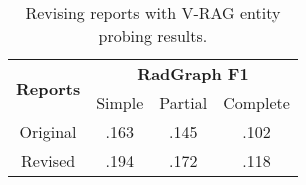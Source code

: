 \begin{table}[]
\begin{center}
\begin{tabular}{cccc}
\hline
\multicolumn{1}{c}{\multirow{2}{*}{\textbf{Reports}}} & \multicolumn{3}{c}{\textbf{RadGraph F1}} \\
\cline{2-4} 
\multicolumn{1}{c}{} & Simple & Partial & Complete  \\ 
\hline
Original & .163 & .145 & .102 \\
Revised & .194 & .172 & .118 \\
\hline
\end{tabular}
\caption{Revising reports with V-RAG entity probing results.}
\vspace{-5mm}
\label{tab:reportgen}
\end{center}
\end{table}
